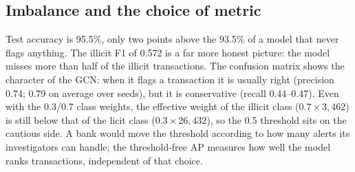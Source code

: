\documentclass[11pt,a4paper]{article}
\begin{document}
\subsection{Imbalance and the choice of metric}
Test accuracy is 95.5\%, only two points above the 93.5\% of a model that never flags anything. The illicit F1 of 0.572 is a
far more honest picture: the model misses more than half of the illicit transactions. The confusion matrix shows the character of the
GCN: when it flags a transaction it is usually right (precision 0.74; 0.79 on average over seeds), but it is conservative (recall
0.44--0.47). Even with the 0.3/0.7 class weights, the effective weight of the illicit class ($0.7\times3{,}462$) is still below that of
the licit class ($0.3\times26{,}432$), so the 0.5 threshold sits on the cautious side. A bank would move the threshold according to how
many alerts its investigators can handle; the threshold-free AP measures how well the model ranks transactions, independent of
that choice.
\end{document}
